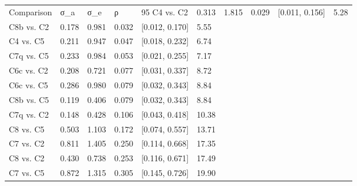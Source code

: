 \begin{tabular}{llllll}
\toprule
Comparison & σ_a & σ_e & ρ & 95%
\midrule
C4 vs. C2 & 0.313 & 1.815 & 0.029 & [0.011, 0.156] & 5.28 \\
C8b vs. C2 & 0.178 & 0.981 & 0.032 & [0.012, 0.170] & 5.55 \\
C4 vs. C5 & 0.211 & 0.947 & 0.047 & [0.018, 0.232] & 6.74 \\
C7q vs. C5 & 0.233 & 0.984 & 0.053 & [0.021, 0.255] & 7.17 \\
C6c vs. C2 & 0.208 & 0.721 & 0.077 & [0.031, 0.337] & 8.72 \\
C6c vs. C5 & 0.286 & 0.980 & 0.079 & [0.032, 0.343] & 8.84 \\
C8b vs. C5 & 0.119 & 0.406 & 0.079 & [0.032, 0.343] & 8.84 \\
C7q vs. C2 & 0.148 & 0.428 & 0.106 & [0.043, 0.418] & 10.38 \\
C8 vs. C5 & 0.503 & 1.103 & 0.172 & [0.074, 0.557] & 13.71 \\
C7 vs. C2 & 0.811 & 1.405 & 0.250 & [0.114, 0.668] & 17.35 \\
C8 vs. C2 & 0.430 & 0.738 & 0.253 & [0.116, 0.671] & 17.49 \\
C7 vs. C5 & 0.872 & 1.315 & 0.305 & [0.145, 0.726] & 19.90 \\
\bottomrule
\end{tabular}
